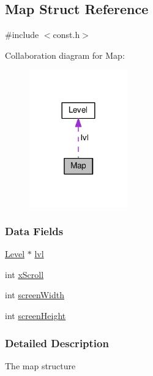\hypertarget{struct_map}{\subsection{Map Struct Reference}
\label{struct_map}
}


{\ttfamily \#include $<$const.\-h$>$}



Collaboration diagram for Map\-:
\nopagebreak
\begin{figure}[H]
\begin{center}
\leavevmode
\includegraphics[width=120pt]{struct_map__coll__graph}
\end{center}
\end{figure}
\subsubsection*{Data Fields}
\begin{DoxyCompactItemize}
\item 
\hyperlink{struct_level}{Level} $\ast$ \hyperlink{struct_map_abca19b7de8e60347a507d1aeff95c764}{lvl}
\item 
int \hyperlink{struct_map_aa83bbdf2603e42824cd0bab44bf315c2}{x\-Scroll}
\item 
int \hyperlink{struct_map_ae50cb92a78d9e0a4f4bd718fc02bd294}{screen\-Width}
\item 
int \hyperlink{struct_map_a9ebc1dbd77788c4bfa27758a6725413f}{screen\-Height}
\end{DoxyCompactItemize}


\subsubsection{Detailed Description}
The map structure 

